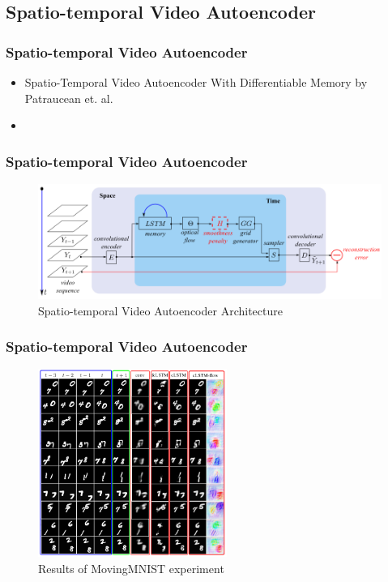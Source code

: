  \subsection{Spatio-temporal Video Autoencoder}
  \begin{frame}
   \frametitle{Spatio-temporal Video Autoencoder}
   
   \begin{itemize}
    \item<1-> \glqq Spatio-Temporal Video Autoencoder With Differentiable Memory \grqq by Patraucean et. al. \cite{Patraucean2015}
    \item<2->
   \end{itemize}
   
  \end{frame}
  \begin{frame}
   \frametitle{Spatio-temporal Video Autoencoder}
   
   \begin{figure}[H]
    \includegraphics[width=1.0\textwidth]{../Images/patraucean.png}
    \centering
    \caption{Spatio-temporal Video Autoencoder Architecture \citep{Patraucean2015}}
    \label{fig:spatiotemp_architecture}
   \end{figure}
  
  \end{frame}
  \begin{frame}
   \frametitle{Spatio-temporal Video Autoencoder}  
  
   \begin{figure}[H]
    \includegraphics[width=0.55\textwidth]{../Images/patraucean_results_mnist.png}
    \centering
    \caption{Results of MovingMNIST experiment \citep{Patraucean2015}}
    \label{fig:lstm_architecture}
   \end{figure}  
  
  \end{frame}
 
